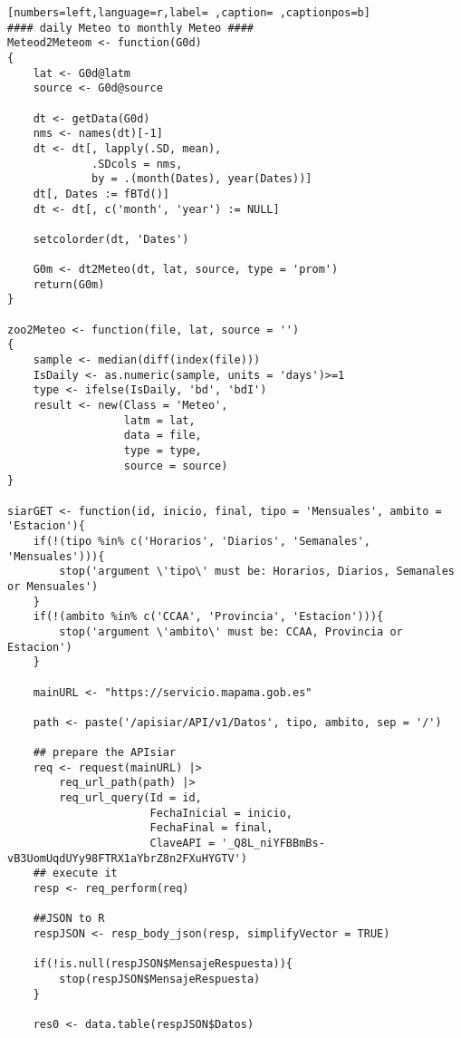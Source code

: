 \begin{lstlisting}[numbers=left,language=r,label= ,caption= ,captionpos=b]
#### daily Meteo to monthly Meteo ####
Meteod2Meteom <- function(G0d)
{
    lat <- G0d@latm
    source <- G0d@source

    dt <- getData(G0d)
    nms <- names(dt)[-1]
    dt <- dt[, lapply(.SD, mean),
             .SDcols = nms,
             by = .(month(Dates), year(Dates))]
    dt[, Dates := fBTd()]
    dt <- dt[, c('month', 'year') := NULL]

    setcolorder(dt, 'Dates')

    G0m <- dt2Meteo(dt, lat, source, type = 'prom')
    return(G0m)
}

zoo2Meteo <- function(file, lat, source = '')
{
    sample <- median(diff(index(file)))
    IsDaily <- as.numeric(sample, units = 'days')>=1
    type <- ifelse(IsDaily, 'bd', 'bdI')
    result <- new(Class = 'Meteo',
                  latm = lat,
                  data = file,
                  type = type,
                  source = source)
}

siarGET <- function(id, inicio, final, tipo = 'Mensuales', ambito = 'Estacion'){
    if(!(tipo %in% c('Horarios', 'Diarios', 'Semanales', 'Mensuales'))){
        stop('argument \'tipo\' must be: Horarios, Diarios, Semanales or Mensuales')
    }
    if(!(ambito %in% c('CCAA', 'Provincia', 'Estacion'))){
        stop('argument \'ambito\' must be: CCAA, Provincia or Estacion')
    }

    mainURL <- "https://servicio.mapama.gob.es"

    path <- paste('/apisiar/API/v1/Datos', tipo, ambito, sep = '/')

    ## prepare the APIsiar
    req <- request(mainURL) |>
        req_url_path(path) |>
        req_url_query(Id = id,
                      FechaInicial = inicio,
                      FechaFinal = final,
                      ClaveAPI = '_Q8L_niYFBBmBs-vB3UomUqdUYy98FTRX1aYbrZ8n2FXuHYGTV')
    ## execute it
    resp <- req_perform(req)

    ##JSON to R
    respJSON <- resp_body_json(resp, simplifyVector = TRUE)

    if(!is.null(respJSON$MensajeRespuesta)){
        stop(respJSON$MensajeRespuesta)
    }

    res0 <- data.table(respJSON$Datos)


\end{lstlisting}
